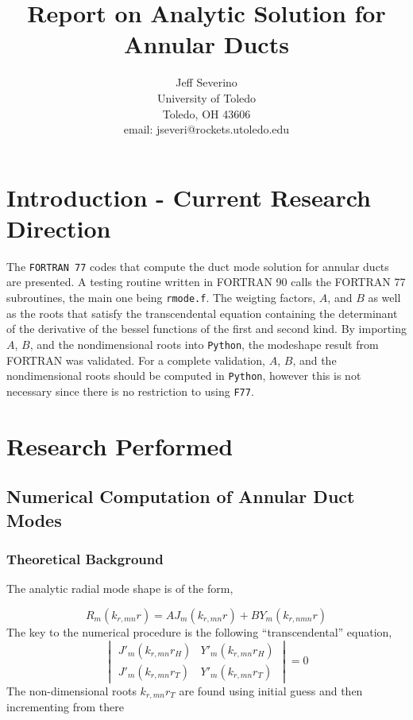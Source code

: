 \documentclass[12pt]{article}
\begin{document}
\begin{titlepage}
\title{
Report on Analytic Solution for Annular Ducts}


\author{ Jeff Severino
 \\
University of Toledo \\
Toledo, OH  43606 \\
email: jseveri@rockets.utoledo.edu  }

\maketitle

\end{titlepage}

\section{Introduction - Current Research Direction}
The \verb|FORTRAN 77| codes that compute the duct mode solution for annular ducts are
presented.  A testing routine written in FORTRAN 90 calls the FORTRAN 77 subroutines, 
the main one being \verb|rmode.f|. The weigting factors, $A$, and $B$ as well as
the roots that satisfy the transcendental equation containing the determinant of 
the derivative of the bessel functions of the first and second kind.  By importing
$A$, $B$, and the nondimensional roots into \verb|Python|, the modeshape result
from FORTRAN was validated. For a complete validation, $A$, $B$, and the 
nondimensional roots should be computed in \verb|Python|, however this is not 
necessary since there is no restriction to using \verb|F77|.


  
\section{Research Performed}
\subsection{Numerical Computation of Annular Duct Modes}
\subsubsection{Theoretical Background}

The analytic radial mode shape is of the form,

\begin{equation}
    R_m(k_{r,mn} r) =  A J_m (k_{r,mn} r) + B Y_m (k_{r,nmn} r)
\end{equation}
The key to the numerical procedure is the following ``transcendental'' equation,
\begin{equation}
    \begin{vmatrix}
        J'_m(k_{r,mn} r_H) &Y'_m(k_{r,mn} r_H) \\
        J'_m(k_{r,mn} r_T) &Y'_m(k_{r,mn} r_T) 
    \end{vmatrix}   
    = 0
\end{equation}
 The non-dimensional roots $k_{r,mn} r_T$ are found using initial guess and then incrementing from there
\end{document}
